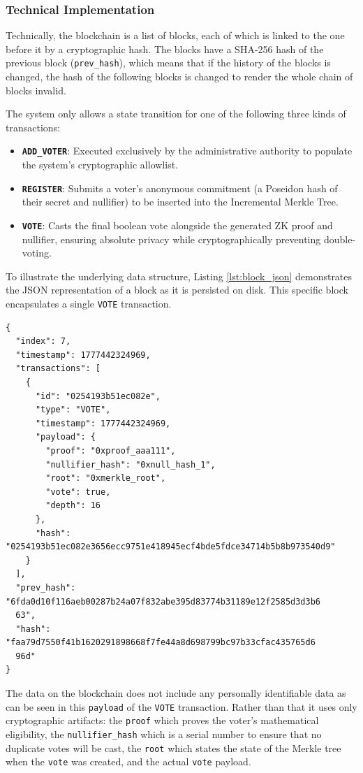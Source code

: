 \documentclass[12pt, a4paper]{report}
\begin{document}
\subsubsection*{Technical Implementation}
Technically, the blockchain is a list of blocks, each of which is linked to the one before it by a cryptographic hash. The blocks have a SHA-256 hash of the previous block (\texttt{prev\_hash}), which means that if the history of the blocks is changed, the hash of the following blocks is changed to render the whole chain of blocks invalid. 

The system only allows a state transition for one of the following three kinds of transactions:
\begin{itemize}
    \item \textbf{\texttt{ADD\_VOTER}}: Executed exclusively by the administrative authority to populate the system's cryptographic allowlist.
    \item \textbf{\texttt{REGISTER}}: Submits a voter's anonymous commitment (a Poseidon hash of their secret and nullifier) to be inserted into the Incremental Merkle Tree.
    \item \textbf{\texttt{VOTE}}: Casts the final boolean vote alongside the generated ZK proof and nullifier, ensuring absolute privacy while cryptographically preventing double-voting.
\end{itemize}

To illustrate the underlying data structure, Listing \ref{lst:block_json} demonstrates the JSON representation of a block as it is persisted on disk. This specific block encapsulates a single \texttt{VOTE} transaction.

\begin{lstlisting}[style=golang, caption={Custom blockchain transaction types}, label={lst:block_json}]
{
  "index": 7,
  "timestamp": 1777442324969,
  "transactions": [
    {
      "id": "0254193b51ec082e",
      "type": "VOTE",
      "timestamp": 1777442324969,
      "payload": {
        "proof": "0xproof_aaa111",
        "nullifier_hash": "0xnull_hash_1",
        "root": "0xmerkle_root",
        "vote": true,
        "depth": 16
      },
      "hash": "0254193b51ec082e3656ecc9751e418945ecf4bde5fdce34714b5b8b973540d9"
    }
  ],
  "prev_hash": "6fda0d10f116aeb00287b24a07f832abe395d83774b31189e12f2585d3d3b6
  63",
  "hash": "faa79d7550f41b1620291898668f7fe44a8d698799bc97b33cfac435765d6
  96d"
}
\end{lstlisting}

The data on the blockchain does not include any personally identifiable data as can be seen in this \texttt{payload} of the \texttt{VOTE} transaction. Rather than that it uses only cryptographic artifacts: the \texttt{proof} which proves the voter's mathematical eligibility, the \texttt{nullifier\_hash} which is a serial number to ensure that no duplicate votes will be cast, the \texttt{root} which states the state of the Merkle tree when the \texttt{vote} was created, and the actual \texttt{vote} payload.
\end{document}
